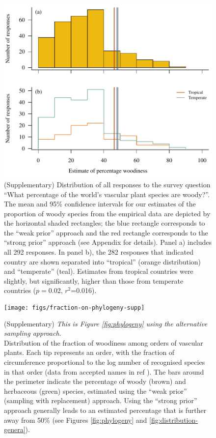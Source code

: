 \documentclass[12pt]{article}
\begin{document}
\begin{figure}[p]
  \centering
  \includegraphics{figs/survey-distribution}
  \caption{(Supplementary) Distribution of all responses to the survey
    question ``What percentage of the world's vascular plant species
    are woody?''.
    The mean and 95\% confidence intervals for our estimates of the
    proportion of woody species from the empirical data are depicted
    by the horizontal shaded rectangles; the blue rectangle
    corresponds to the ``weak prior'' approach and the red rectangle
    corresponds to the ``strong prior'' approach (see Appendix for
    details).  
    Panel a) includes all 292 responses.  In panel b), the 282
    responses that indicated country are shown separated into
    ``tropical'' (orange distribution) and ``temperate'' (teal).
    Estimates from tropical countries were slightly, but
    significantly, higher than those from temperate countries
    ($p=$0.02, $r^2$=0.016).
  }

  \label{fig:survey-distribution}
\end{figure}

\begin{figure}[p]
  \centering
  \texttt{[image: figs/fraction-on-phylogeny-supp]}

  \caption{(Supplementary)
    \textit{This is Figure \ref{fig:phylogeny} using the alternative
      sampling approach.}\\
    Distribution of the fraction of woodiness among orders of vascular
    plants.  Each tip represents an order, with the fraction of
    circumference proportional to the log number of recognised species
    in that order (data from accepted names in ref
    \citep{ThePlantList}).  The bars around the perimeter indicate the
    percentage of woody (brown) and herbaceous (green) species,
    estimated using the ``weak prior'' (sampling with replacement)
    approach.  Using the ``strong prior'' approach generally leads to
    an estimated percentage that is further away from 50\% (see
    Figures \ref{fig:phylogeny} and \ref{fig:distribution-genera}).}
  \label{fig:phylogeny-supp}
\end{figure}
\end{document}
